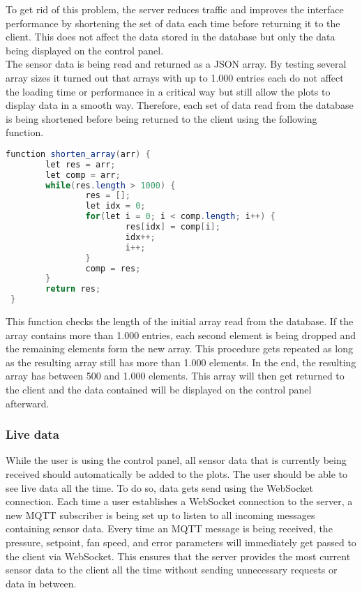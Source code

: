 To get rid of this problem, the server reduces traffic and improves the interface performance by shortening the set of data each time before returning it to the client. This does not affect the data stored in the database but only the data being displayed on the control panel. \\

The sensor data is being read and returned as a JSON array. By testing several array sizes it turned out that arrays with up to 1.000 entries each do not affect the loading time or performance in a critical way but still allow the plots to display data in a smooth way.  Therefore, each set of data read from the database is being shortened before being returned to the client using the following function.

\begin{lstlisting}[language = Java, numbers = none]
 function shorten_array(arr) {
 		let res = arr;
 		let comp = arr;
 		while(res.length > 1000) {
 				res = [];
 				let idx = 0;
 				for(let i = 0; i < comp.length; i++) {
 						res[idx] = comp[i];
 						idx++;
 						i++;
 				}
 				comp = res;
 		}
 		return res;
 }
\end{lstlisting}

This function checks the length of the initial array read from the database. If the array contains more than 1.000 entries, each second element is being dropped and the remaining elements form the new array. This procedure gets repeated as long as the resulting array still has more than 1.000 elements. In the end, the resulting array has between 500 and 1.000 elements. This array will then get returned to the client and the data contained will be displayed on the control panel afterward. 


\subsubsection{Live data}
\label{subsec:live_data}

While the user is using the control panel, all sensor data that is currently being received should automatically be added to the plots. The user should be able to see live data all the time.
To do so,  data gets send using the WebSocket connection. Each time a user establishes a WebSocket connection to the server, a new MQTT subscriber is being set up to listen to all incoming messages containing sensor data. Every time an MQTT message is being received, the pressure, setpoint, fan speed, and error parameters will immediately get passed to the client via WebSocket. This ensures that the server provides the most current sensor data to the client all the time without sending unnecessary requests or data in between.


